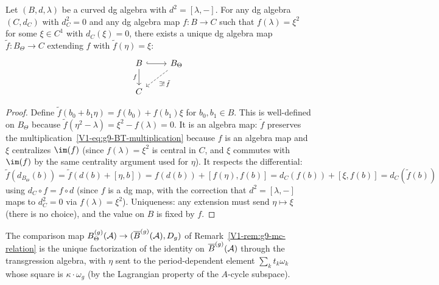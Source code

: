 \begin{proposition}
Let $(B, d, \lambda)$ be a curved dg algebra with
$d^2 = [\lambda, -]$. For any dg algebra $(C, d_C)$ with
$d_C^2 = 0$ and any dg algebra map $f\colon B \to C$ such that
$f(\lambda) = \xi^2$ for some $\xi \in C^1$ with $d_C(\xi) = 0$,
there exists a unique dg algebra map $\tilde{f}\colon B_\Theta \to C$
extending $f$ with $\tilde{f}(\eta) = \xi$:
\[
\begin{tikzcd}
B \arrow[r, hook] \arrow[d, "f"'] &
B_\Theta \arrow[dl, dashed, "\exists!\,\tilde{f}"] \\
C &
\end{tikzcd}
\]
\end{proposition}

\begin{proof}
Define $\tilde{f}(b_0 + b_1\eta) = f(b_0) + f(b_1)\xi$ for
$b_0, b_1 \in B$. This is well-defined on $B_\Theta$ because
$\tilde{f}(\eta^2 - \lambda) = \xi^2 - f(\lambda) = 0$.
It is an algebra map: $\tilde{f}$ preserves the
multiplication~\eqref{V1-eq:g9-BT-multiplication} because $f$ is an
algebra map and $\xi$ centralizes $\im(f)$ (since $f(\lambda) = \xi^2$
is central in $C$, and $\xi$ commutes with $\im(f)$ by the
same centrality argument used for $\eta$). It respects the
differential: $\tilde{f}(d_{B_\Theta}(b)) = \tilde{f}(d(b) +
[\eta, b]) = f(d(b)) + [f(\eta), f(b)] = d_C(f(b)) +
[\xi, f(b)] = d_C(\tilde{f}(b))$ using $d_C \circ f = f \circ d$
(since $f$ is a dg map, with the correction that $d^2 = [\lambda, -]$
maps to $d_C^2 = 0$ via $f(\lambda) = \xi^2$). Uniqueness: any
extension must send $\eta \mapsto \xi$ (there is no choice), and
the value on $B$ is fixed by $f$.
\end{proof}

\begin{corollary}
The comparison map $B_\Theta^{(g)}(\mathcal{A}) \to (\overline{B}^{(g)}(\mathcal{A}),
D_{g})$ of Remark~\ref{V1-rem:g9-mc-relation} is the unique factorization
of the identity on $\overline{B}^{(g)}(\mathcal{A})$ through the transgression
algebra, with $\eta$ sent to the period-dependent element
$\sum_k t_k \omega_k$ whose square is $\kappa \cdot \omega_g$ (by the
Lagrangian property of the $A$-cycle subspace).
\end{corollary}

%
%

